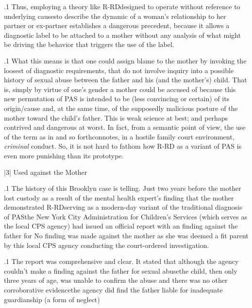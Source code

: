 \documentclass[11pt, twoside]{article}
\begin{document}
{\p.1{%
Thus, employing a theory like R-RD\mdash{}designed to operate without
reference to underlying causes\mdash{}to describe the dynamic of a woman’s
relationship to her partner or ex-partner establishes a dangerous precedent, because it allows a diagnostic label to be attached to a mother
without any analysis of what might be driving the behavior that triggers
the use of the label.
}%

\p.1{%
What this means is that one could assign blame to the mother by
invoking the loosest of diagnostic requirements, that do not involve inquiry into a possible history of sexual abuse between the father and
his (and the mother’s) child. That is, simply by virtue of one’s gender a mother could be accused of  because
this new permutation of PAS is intended to be  (less
convincing or certain) of its origin/cause and, at the same time,  of the supposedly malicious posture of the mother toward
the child’s father. This is weak science at best; and perhaps contrived and
dangerous at worst. In fact, from a semantic point of view, the use of the
term \mdash{}as in   and so forth\mdash{}connotes, in a hostile family
court environment, \textit{criminal} conduct. So, it is not hard to
fathom how R-RD as a variant of PAS is even more punishing than its
prototype.
}%


\s|3|{
 Used against the Mother}

\p.1{%
\noindent{}The history of this Brooklyn case is telling. Just two years before the
mother lost custody as a result of the mental health expert’s finding that the mother demonstrated R-RD\mdash{}serving as a modern-day
variant of the traditional diagnosis of PAS\mdash{}the New York City Administration for Children’s Services (which serves as the local CPS
agency) had issued an official  report
with an  finding against the father for  No finding was made against the mother as she was deemed
a fit parent by this local CPS agency conducting the court-ordered
investigation.
}%

\p.1{%
The report was comprehensive and clear. It stated that although the
agency couldn’t make a finding against the father for sexual abuse\mdash{}the
child, then only three years of age, was unable to confirm the abuse and
there was no other corroborative evidence\mdash{}the agency did find the father liable for inadequate guardianship (a form of neglect) 
}%


}
\end{document}
